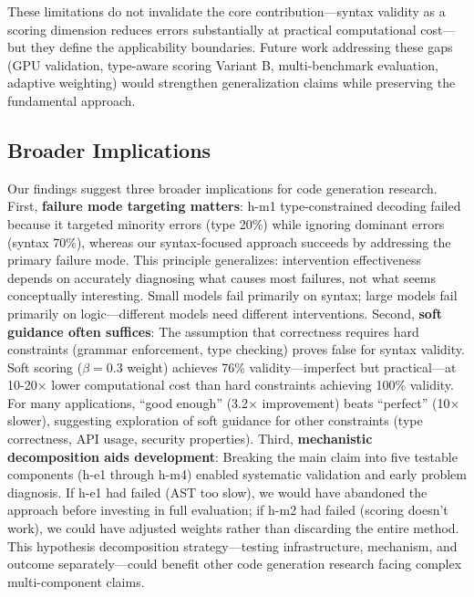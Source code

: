 These limitations do not invalidate the core contribution---syntax validity as a scoring dimension reduces errors substantially at practical computational cost---but they define the applicability boundaries. Future work addressing these gaps (GPU validation, type-aware scoring Variant B, multi-benchmark evaluation, adaptive weighting) would strengthen generalization claims while preserving the fundamental approach.

\subsection{Broader Implications}

Our findings suggest three broader implications for code generation research. First, \textbf{failure mode targeting matters}: h-m1 type-constrained decoding failed because it targeted minority errors (type 20\%) while ignoring dominant errors (syntax 70\%), whereas our syntax-focused approach succeeds by addressing the primary failure mode. This principle generalizes: intervention effectiveness depends on accurately diagnosing what causes most failures, not what seems conceptually interesting. Small models fail primarily on syntax; large models fail primarily on logic---different models need different interventions. Second, \textbf{soft guidance often suffices}: The assumption that correctness requires hard constraints (grammar enforcement, type checking) proves false for syntax validity. Soft scoring ($\beta=0.3$ weight) achieves 76\% validity---imperfect but practical---at 10-20$\times$ lower computational cost than hard constraints achieving 100\% validity. For many applications, ``good enough'' (3.2$\times$ improvement) beats ``perfect'' (10$\times$ slower), suggesting exploration of soft guidance for other constraints (type correctness, API usage, security properties). Third, \textbf{mechanistic decomposition aids development}: Breaking the main claim into five testable components (h-e1 through h-m4) enabled systematic validation and early problem diagnosis. If h-e1 had failed (AST too slow), we would have abandoned the approach before investing in full evaluation; if h-m2 had failed (scoring doesn't work), we could have adjusted weights rather than discarding the entire method. This hypothesis decomposition strategy---testing infrastructure, mechanism, and outcome separately---could benefit other code generation research facing complex multi-component claims.
